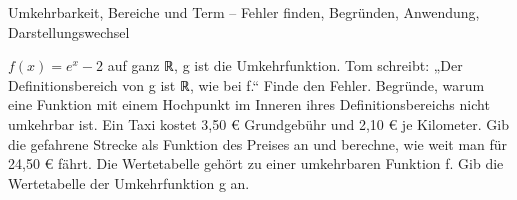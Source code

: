 \begin{aufgabe}{Umkehrbarkeit, Bereiche und Term – Fehler finden, Begründen, Anwendung, Darstellungswechsel}
\begin{teile}
\teil $f(x) = e^x - 2$ auf ganz ℝ, g ist die Umkehrfunktion. Tom schreibt: „Der Definitionsbereich von g ist ℝ, wie bei f.“ Finde den Fehler.
\teil Begründe, warum eine Funktion mit einem Hochpunkt im Inneren ihres Definitionsbereichs nicht umkehrbar ist.
\teil Ein Taxi kostet 3,50 € Grundgebühr und 2,10 € je Kilometer. Gib die gefahrene Strecke als Funktion des Preises an und berechne, wie weit man für 24,50 € fährt.
\teil Die Wertetabelle gehört zu einer umkehrbaren Funktion f. Gib die Wertetabelle der Umkehrfunktion g an.

\end{teile}
\end{aufgabe}
